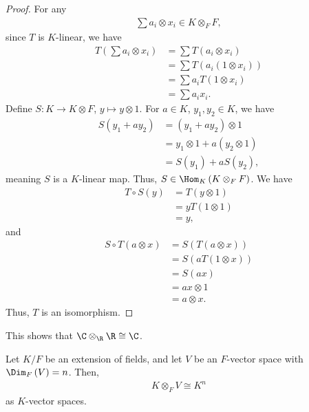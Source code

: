 \documentclass[10pt]{mypackage}
\begin{document}
\begin{proof}
  For any
  \begin{align*}
    \sum a_i\otimes x_i\in K\otimes_{F}F,
  \end{align*}
  since $T$ is $K$-linear, we have
  \begin{align*}
    T\left(\sum a_i\otimes x_i\right) &= \sum T\left(a_i\otimes x_i\right)\\
                                      &= \sum T\left(a_i\left(1\otimes x_i\right)\right)\\
                                      &= \sum a_iT\left(1\otimes x_i\right)\\
                                      &= \sum a_ix_i.
  \end{align*}
  Define $S: K\rightarrow K\otimes F$, $y\mapsto y\otimes 1$. For $a\in K$, $y_1,y_2\in K$, we have
  \begin{align*}
    S\left(y_1 + ay_2\right) &= \left(y_1 + ay_2\right)\otimes 1\\
                             &= y_1\otimes 1 + a\left(y_2\otimes 1\right)\\
                             &= S\left(y_1\right) + aS\left(y_2\right),
  \end{align*}
  meaning $S$ is a $K$-linear map. Thus, $S\in \Hom_{K}\left(K\otimes_{F}F\right)$. We have
  \begin{align*}
    T\circ S(y) &= T\left(y\otimes 1\right)\\
                &= yT\left(1\otimes 1\right)\\
                &= y,
  \end{align*}
  and
  \begin{align*}
    S\circ T\left(a\otimes x\right) &= S\left(T\left(a\otimes x\right)\right)\\
                                    &= S\left(aT\left(1\otimes x\right)\right)\\
                                    &= S\left(ax\right)\\
                                    &= ax\otimes 1\\
                                    &= a\otimes x.
  \end{align*}
  Thus, $T$ is an isomorphism.
  \end{proof}
  \begin{remark}
    This shows that $\C\otimes_{\R}\R \cong \C$.
  \end{remark}
  \begin{proposition}
    Let $K/F$ be an extension of fields, and let $V$ be an $F$-vector space with $\Dim_{F}\left(V\right) = n$. Then,
    \begin{align*}
      K\otimes_{F}V \cong K^{n}
    \end{align*}
    as $K$-vector spaces.
  \end{proposition}
\end{document}
